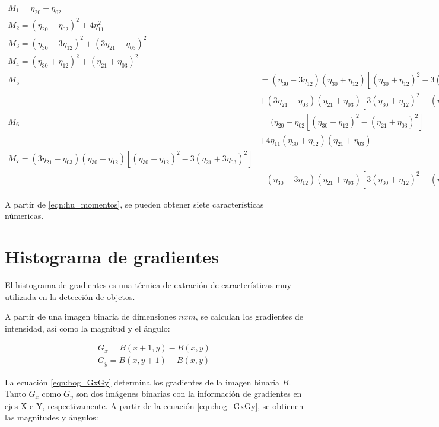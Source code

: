 \begin{equation}
	\label{eqn:hu_momentos}
	\begin{split}
		M_{1} = \eta_{20} + \eta_{02} \\
		M_{2} = (\eta_{20}-\eta_{02})^{2} + 4\eta_{11}^{2} \\
		M_{3} = (\eta_{30}-3\eta_{12})^{2} + (3\eta_{21}-\eta_{03})^{2} \\
		M_{4} = (\eta_{30}+\eta_{12})^{2} + (\eta_{21}+\eta_{03})^{2} \\
		M_{5} & = (\eta_{30}-3\eta_{12})(\eta_{30}+\eta_{12})[(\eta_{30}+\eta_{12})^{2}-3(\eta_{21}+3\eta_{03})^{2}] \\
		& +(3\eta_{21}-\eta_{03})(\eta_{21}+\eta_{03})[3(\eta_{30}+\eta_{12})^{2}-(\eta_{21}+\eta_{03})^{2}] \\
		M_{6} & = (\eta_{20}-\eta_{02}[(\eta_{30}+\eta_{12})^{2}-(\eta_{21}+\eta_{03})^{2}] \\
		& +4\eta_{11}(\eta_{30}+\eta_{12})(\eta_{21}+\eta_{03}) \\
		M_{7} = (3\eta_{21}-\eta_{03})(\eta_{30}+\eta_{12})[(\eta_{30}+\eta_{12})^{2}-3(\eta_{21}+3\eta_{03})^{2}] \\
		& -(\eta_{30}-3\eta_{12})(\eta_{21}+\eta_{03})[3(\eta_{30}+\eta_{12})^{2}-(\eta_{21}+\eta_{03})^{2}]
	\end{split}
\end{equation}


A partir de \ref{eqn:hu_momentos}, se pueden obtener siete características númericas.

\section{Histograma de gradientes}

El histograma de gradientes \cite{osti_6007283} es una técnica de extración de características muy utilizada en la detección de objetos.

A partir de una imagen binaria de dimensiones $ nxm $, se calculan los gradientes de intensidad, así como la magnitud y el ángulo:

\begin{equation}
	\label{eqn:hog_GxGy}
	\begin{split}		
		G_{x} = B(x+1,y) - B(x,y) \\
		G_{y} = B(x,y+1) - B(x,y)
	\end{split}
\end{equation}

La ecuación \ref{eqn:hog_GxGy} determina los gradientes de la imagen binaria \(B\). Tanto \(G_{x}\) como \(G_{y}\) son dos imágenes binarias con la información de gradientes en ejes X e Y, respectivamente. 
A partir de la ecuación \ref{eqn:hog_GxGy}, se obtienen las magnitudes y ángulos:

